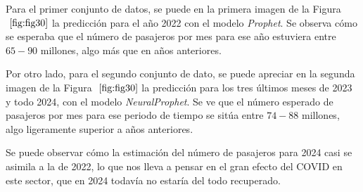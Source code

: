 \documentclass[12pt,twoside]{article}
\begin{document}
Para el primer conjunto de datos, se puede en la primera imagen de la Figura $~\ref{fig:fig30}$ la predicción para el año 2022 con el modelo \textit{Prophet}. Se observa cómo se esperaba que el número de pasajeros por mes para ese año estuviera entre $65-90$ millones, algo más que en años anteriores.

Por otro lado, para el segundo conjunto de dato, se puede apreciar en la segunda imagen de la Figura $~\ref{fig:fig30}$ la predicción para los tres últimos meses de 2023 y todo 2024, con el modelo \textit{NeuralProphet}. Se ve que el número esperado de pasajeros por mes para ese periodo de tiempo se sitúa entre $74-88$ millones, algo ligeramente superior a años anteriores.

Se puede observar cómo la estimación del número de pasajeros para 2024 casi se asimila a la de 2022, lo que nos lleva a pensar en el gran efecto del COVID en este sector, que en 2024 todavía no estaría del todo recuperado.
\newpage
\end{document}
